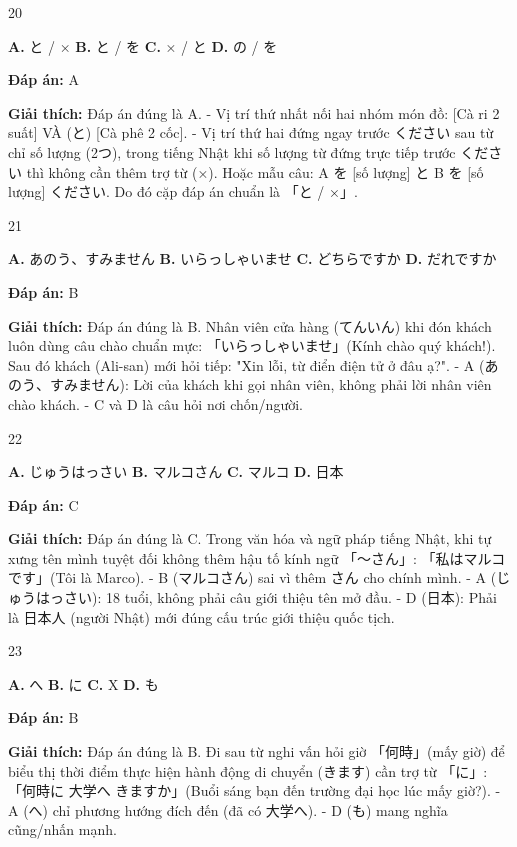 \documentclass[12pt,a4paper]{report}
\newcommand{\source}[1]{}
\newcommand{\choice}[2]{\textbf{#1.} #2 \quad}
\newcommand{\answer}[1]{\par\textbf{Đáp án:} #1}
\newcommand{\confidence}[1]{}
\newcommand{\explain}[1]{\par\textbf{Giải thích:} #1\vspace{0.5cm}}
\begin{document}
\begin{question}{20}
\source{29.webp}
\choice{A}{と / ×}
\choice{B}{と / を}
\choice{C}{× / と}
\choice{D}{の / を}
\answer{A}
\confidence{high}
\explain{Đáp án đúng là A. 
- Vị trí thứ nhất nối hai nhóm món đồ: [Cà ri 2 suất] VÀ (と) [Cà phê 2 cốc].
- Vị trí thứ hai đứng ngay trước ください sau từ chỉ số lượng (2つ), trong tiếng Nhật khi số lượng từ đứng trực tiếp trước ください thì không cần thêm trợ từ (×). Hoặc mẫu câu: A を [số lượng] と B を [số lượng] ください. Do đó cặp đáp án chuẩn là 「と / ×」.}
\end{question}

\begin{question}{21}
\source{30.webp}
\choice{A}{あのう、すみません}
\choice{B}{いらっしゃいませ}
\choice{C}{どちらですか}
\choice{D}{だれですか}
\answer{B}
\confidence{high}
\explain{Đáp án đúng là B. Nhân viên cửa hàng (てんいん) khi đón khách luôn dùng câu chào chuẩn mực: 「いらっしゃいませ」(Kính chào quý khách!). Sau đó khách (Ali-san) mới hỏi tiếp: "Xin lỗi, từ điển điện tử ở đâu ạ?".
- A (あのう、すみません): Lời của khách khi gọi nhân viên, không phải lời nhân viên chào khách.
- C và D là câu hỏi nơi chốn/người.}
\end{question}

\begin{question}{22}
\source{Q11.jpg}
\choice{A}{じゅうはっさい}
\choice{B}{マルコさん}
\choice{C}{マルコ}
\choice{D}{日本}
\answer{C}
\confidence{high}
\explain{Đáp án đúng là C. Trong văn hóa và ngữ pháp tiếng Nhật, khi tự xưng tên mình tuyệt đối không thêm hậu tố kính ngữ 「〜さん」: 「私はマルコです」(Tôi là Marco).
- B (マルコさん) sai vì thêm さん cho chính mình.
- A (じゅうはっさい): 18 tuổi, không phải câu giới thiệu tên mở đầu.
- D (日本): Phải là 日本人 (người Nhật) mới đúng cấu trúc giới thiệu quốc tịch.}
\end{question}

\begin{question}{23}
\source{Q17.jpg}
\choice{A}{へ}
\choice{B}{に}
\choice{C}{X}
\choice{D}{も}
\answer{B}
\confidence{high}
\explain{Đáp án đúng là B. Đi sau từ nghi vấn hỏi giờ 「何時」(mấy giờ) để biểu thị thời điểm thực hiện hành động di chuyển (きます) cần trợ từ 「に」: 「何時に 大学へ きますか」(Buổi sáng bạn đến trường đại học lúc mấy giờ?).
- A (へ) chỉ phương hướng đích đến (đã có 大学へ).
- D (も) mang nghĩa cũng/nhấn mạnh.}
\end{question}
\end{document}
